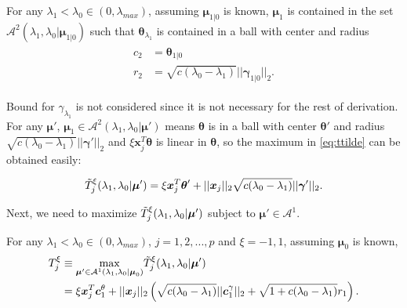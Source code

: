 \begin{theorem}
    \label{thm:1.3.alt}
    For any $\lambda_1<\lambda_{0}\in (0,\lambda_{max})$, assuming $\boldsymbol\mu_{1|0}$ is known, $\boldsymbol\mu_1$ is contained in the set $\mathcal{A}^2(\lambda_1,\lambda_0|\boldsymbol\mu_{1|0})$ such that $\boldsymbol\theta_{\lambda_1}$ is contained in a ball with center and radius
    \begin{gather}
        \begin{aligned}
            c_2&=\boldsymbol\theta_{1|0}\\
            r_2&=\sqrt{c(\lambda_0-\lambda_1)}||\boldsymbol\gamma_{1|0}||_2.
        \end{aligned}
    \end{gather}
\end{theorem}

Bound for $\gamma_{\lambda_1}$ is not considered since it is not necessary for the rest of derivation. For any $\boldsymbol\mu'$, $\boldsymbol\mu_1\in\mathcal{A}^2(\lambda_1,\lambda_0|\boldsymbol\mu')$ means $\boldsymbol\theta$ is in a ball with center $\boldsymbol\theta'$ and radius $\sqrt{c(\lambda_0-\lambda_1)}||\boldsymbol\gamma'||_2$ and $\xi \boldsymbol x_j^T\boldsymbol\theta$ is linear in $\boldsymbol\theta$, so the maximum in \eqref{eq:ttilde} can be obtained easily:

\begin{equation}
    \label{eq:ttildexi.alt}
    \Tilde{T}^\xi_j(\lambda_1,\lambda_0|\boldsymbol\mu')=\xi \boldsymbol x_j^T\boldsymbol\theta'+||\boldsymbol x_j||_2\sqrt{c(\lambda_0-\lambda_1)}||\boldsymbol\gamma'||_2.
\end{equation}

Next, we need to maximize $\Tilde{T}^\xi_j(\lambda_1,\lambda_0|\boldsymbol\mu')$ subject to $\boldsymbol\mu'\in\mathcal{A}^1$.

\begin{theorem}
    \label{thm:2.1.alt}
    For any $\lambda_1<\lambda_{0}\in (0,\lambda_{max})$, $j=1,2,...,p$ and $\xi=-1,1$, assuming $\boldsymbol\mu_0$ is known,
    \begin{gather}
        \begin{aligned}
            T^\xi_j&\equiv\underset{\boldsymbol\mu'\in\mathcal{A}^1(\lambda_1,\lambda_0|\boldsymbol\mu_0)}{\mathrm{max}}\Tilde{T}^\xi_j(\lambda_1,\lambda_0|\boldsymbol\mu')\\
            &=\xi \boldsymbol x_j^T \boldsymbol c_1^\theta+||\boldsymbol x_j||_2\left(\sqrt{c(\lambda_0-\lambda_1)}||\boldsymbol c_1^\gamma||_2+\sqrt{1+c(\lambda_0-\lambda_1)}r_1\right).
        \end{aligned}
    \end{gather}
\end{theorem}

